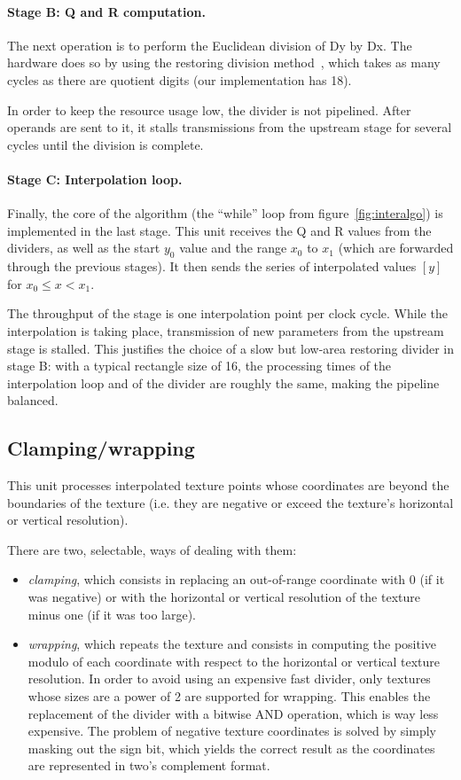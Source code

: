 \documentclass[a4paper,11pt]{kthesis}
\begin{document}
\paragraph{Stage B: Q and R computation.} The next operation is to perform the Euclidean division of Dy by Dx. The hardware does so by using the restoring division method~\cite{restdiv}, which takes as many cycles as there are quotient digits (our implementation has 18).

In order to keep the resource usage low, the divider is not pipelined. After operands are sent to it, it stalls transmissions from the upstream stage for several cycles until the division is complete.

\paragraph{Stage C: Interpolation loop.}
Finally, the core of the algorithm (the ``while'' loop from figure~\ref{fig:interalgo}) is implemented in the last stage. This unit receives the Q and R values from the dividers, as well as the start $y_{0}$ value and the range $x_{0}$ to $x_{1}$ (which are forwarded through the previous stages). It then sends the series of interpolated values $[y]$ for $x_{0} \leq x < x_{1}$.

The throughput of the stage is one interpolation point per clock cycle. While the interpolation is taking place, transmission of new parameters from the upstream stage is stalled. This justifies the choice of a slow but low-area restoring divider in stage B: with a typical rectangle size of 16, the processing times of the interpolation loop and of the divider are roughly the same, making the pipeline balanced.

\subsection{Clamping/wrapping}
This unit processes interpolated texture points whose coordinates are beyond the boundaries of the texture (i.e. they are negative or exceed the texture's horizontal or vertical resolution).

There are two, selectable, ways of dealing with them:
\begin{itemize}
\item \textit{clamping}, which consists in replacing an out-of-range coordinate with 0 (if it was negative) or with the horizontal or vertical resolution of the texture minus one (if it was too large).
\item \textit{wrapping}, which repeats the texture and consists in computing the positive modulo of each coordinate with respect to the horizontal or vertical texture resolution. In order to avoid using an expensive fast divider, only textures whose sizes are a power of 2 are supported for wrapping. This enables the replacement of the divider with a bitwise AND operation, which is way less expensive. The problem of negative texture coordinates is solved by simply masking out the sign bit, which yields the correct result as the coordinates are represented in two's complement format.
\end{itemize}
\end{document}
